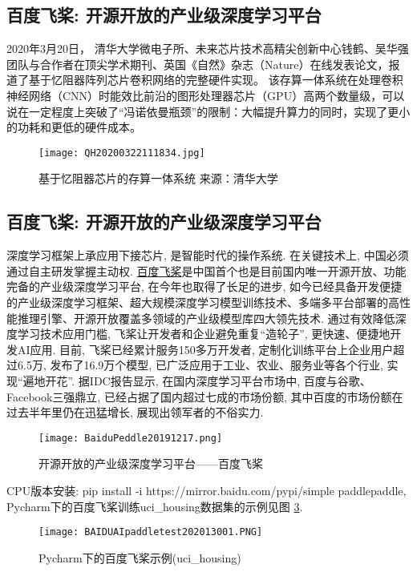 \subsection{百度飞桨: 开源开放的产业级深度学习平台}
2020年3月20日， 清华大学微电子所、未来芯片技术高精尖创新中心钱鹤、吴华强团队与合作者在顶尖学术期刊、英国《自然》杂志（Nature）在线发表论文，报道了基于忆阻器阵列芯片卷积网络的完整硬件实现。
该存算一体系统在处理卷积神经网络（CNN）时能效比前沿的图形处理器芯片（GPU）高两个数量级，可以说在一定程度上突破了“冯诺依曼瓶颈”的限制：大幅提升算力的同时，实现了更小的功耗和更低的硬件成本。
\begin{figure}[H]
	\centering
	\texttt{[image: QH20200322111834.jpg]}
	\caption{基于忆阻器芯片的存算一体系统 来源：清华大学}
   \label{QH20200322111834}
\end{figure}
\subsection{百度飞桨: 开源开放的产业级深度学习平台}
深度学习框架上承应用下接芯片, 是智能时代的操作系统. 在关键技术上, 中国必须通过自主研发掌握主动权. \href{https://www.paddlepaddle.org.cn/}{百度飞桨}是中国首个也是目前国内唯一开源开放、功能完备的产业级深度学习平台, 在今年也取得了长足的进步, 如今已经具备开发便捷的产业级深度学习框架、超大规模深度学习模型训练技术、多端多平台部署的高性能推理引擎、开源开放覆盖多领域的产业级模型库四大领先技术. 通过有效降低深度学习技术应用门槛, 飞桨让开发者和企业避免重复“造轮子”, 更快速、便捷地开发AI应用. 目前, 飞桨已经累计服务150多万开发者, 定制化训练平台上企业用户超过6.5万, 发布了16.9万个模型, 已广泛应用于工业、农业、服务业等各个行业, 实现“遍地开花”. 据IDC报告显示, 在国内深度学习平台市场中, 百度与谷歌、Facebook三强鼎立, 已经占据了国内超过七成的市场份额, 其中百度的市场份额在过去半年里仍在迅猛增长, 展现出领军者的不俗实力.
\begin{figure}[H]
	\centering
	\texttt{[image: BaiduPeddle20191217.png]}
	\caption{开源开放的产业级深度学习平台——百度飞桨}
   \label{BaiduPeddle20191217}
\end{figure}

CPU版本安装: pip install -i https://mirror.baidu.com/pypi/simple paddlepaddle, Pycharm下的百度飞桨训练uci\_housing数据集的示例见图 \ref{BAIDUAIpaddletest202013001}.
\begin{figure}[H]
	\centering
	\texttt{[image: BAIDUAIpaddletest202013001.PNG]}
	\caption{Pycharm下的百度飞桨示例(uci\_housing)}
   \label{BAIDUAIpaddletest202013001}
\end{figure}
